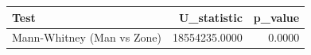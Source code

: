 \begin{tabular}{lrr}
\toprule
Test & U\_statistic & p\_value \\
\midrule
Mann-Whitney (Man vs Zone) & 18554235.0000 & 0.0000 \\
\bottomrule
\end{tabular}
